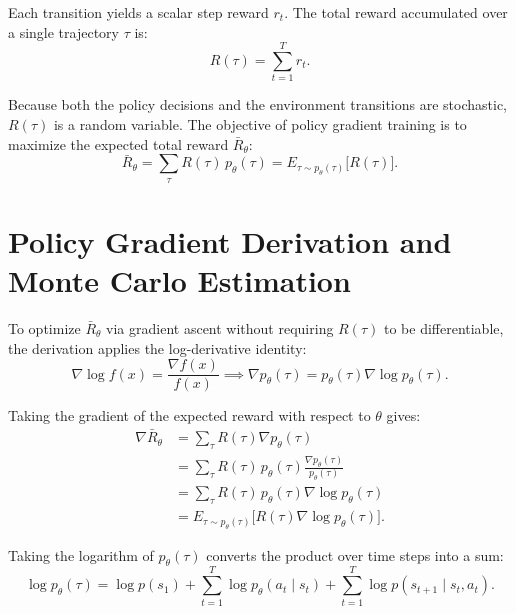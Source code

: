 \documentclass[11pt, a4paper]{article}
\begin{document}
Each transition yields a scalar step reward $r_t$. The total reward accumulated over a single trajectory $\tau$ is:
\begin{equation}\label{eq:pg-episode-return}
    R(\tau) = \sum_{t=1}^{T} r_t.
\end{equation}

Because both the policy decisions and the environment transitions are stochastic, $R(\tau)$ is a random variable. The objective of policy gradient training is to maximize the expected total reward $\bar{R}_\theta$:
\begin{equation}\label{eq:pg-expected-return}
    \bar{R}_\theta = \sum_{\tau} R(\tau)\, p_\theta(\tau) = E_{\tau \sim p_\theta(\tau)}\big[R(\tau)\big].
\end{equation}

\section{Policy Gradient Derivation and Monte Carlo Estimation}

To optimize $\bar{R}_\theta$ via gradient ascent without requiring $R(\tau)$ to be differentiable, the derivation applies the log-derivative identity:
\begin{equation}\label{eq:pg-log-derivative}
    \nabla \log f(x) = \frac{\nabla f(x)}{f(x)} \implies \nabla p_\theta(\tau) = p_\theta(\tau) \nabla \log p_\theta(\tau).
\end{equation}

Taking the gradient of the expected reward with respect to $\theta$ gives:
\begin{align}
    \nabla \bar{R}_\theta &= \sum_{\tau} R(\tau) \nabla p_\theta(\tau) \nonumber \\
    &= \sum_{\tau} R(\tau)\, p_\theta(\tau) \frac{\nabla p_\theta(\tau)}{p_\theta(\tau)} \nonumber \\
    &= \sum_{\tau} R(\tau)\, p_\theta(\tau) \nabla \log p_\theta(\tau) \nonumber \\
    &= E_{\tau \sim p_\theta(\tau)}\big[R(\tau) \nabla \log p_\theta(\tau)\big].\label{eq:pg-policy-gradient}
\end{align}

Taking the logarithm of $p_\theta(\tau)$ converts the product over time steps into a sum:
\begin{equation}\label{eq:pg-log-trajectory}
    \log p_\theta(\tau) = \log p(s_1) + \sum_{t=1}^{T} \log p_\theta(a_t \mid s_t) + \sum_{t=1}^{T} \log p(s_{t+1} \mid s_t, a_t).
\end{equation}
\end{document}
